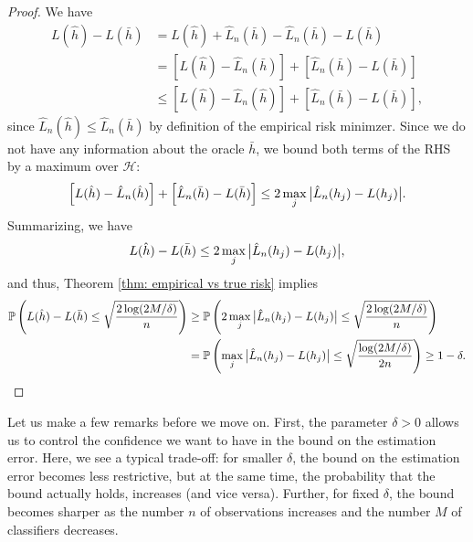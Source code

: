 \begin{proof}
We have
\begin{align*}
    L(\hat h) - L(\bar h) &= L(\hat h) + \hat L_n(\bar h) - \hat L_n(\bar h) - L(\bar h) \\
        &= \left[L(\hat h) - \hat L_n(\bar h)\right] + \left[\hat L_n(\bar h) - L(\bar h)\right] \\
        &\leq \left[L(\hat h) - \hat L_n(\hat h)\right] + \left[\hat L_n(\bar h) - L(\bar h)\right],
\end{align*}
since $\hat L_n(\hat h) \leq \hat L_n(\bar h)$ by definition of the empirical risk minimzer. Since we do not have any information about the oracle $\bar h$, we bound both terms of the RHS by a maximum over $\mathcal{H}$:
\[
    \left[L(\hat h) - \hat L_n(\hat h)\right] + \left[\hat L_n(\bar h) - L(\bar h)\right] \leq 2 \max_j \big\lvert \hat L_n(h_j) - L(h_j) \big\rvert.
\]
Summarizing, we have
\[
    L(\hat h) - L(\bar h) \leq 2 \max_j \big\lvert \hat L_n(h_j) - L(h_j) \big\rvert,
\]
and thus, Theorem \ref{thm: empirical vs true risk} implies
\begin{align*}
    \mathbb{P}\left(L(\hat h) - L(\bar h) \leq \sqrt{\frac{2\log(2M/\delta)}{n}}\right) &\geq \mathbb{P}\left(2 \max_j \big\lvert \hat L_n(h_j) - L(h_j) \big\rvert \leq \sqrt{\frac{2\log(2M/\delta)}{n}}\right) \\
        &= \mathbb{P}\left(\max_j \big\lvert \hat L_n(h_j) - L(h_j) \big\rvert \leq \sqrt{\frac{\log(2M/\delta)}{2n}}\right) \geq 1 - \delta.
\end{align*}
\end{proof}

Let us make a few remarks before we move on. First, the parameter $\delta > 0$ allows us to control the confidence we want to have in the bound on the estimation error. Here, we see a typical trade-off: for smaller $\delta$, the bound on the estimation error becomes less restrictive, but at the same time, the probability that the bound actually holds, increases (and vice versa). Further, for fixed $\delta$, the bound becomes sharper as the number $n$ of observations increases and the number $M$ of classifiers decreases.
